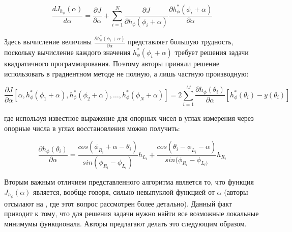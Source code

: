 \documentclass[a4paper, 12pt, titlepage]{article}
\theoremstyle{definition}
\theoremstyle{plain}
\theoremstyle{plain}
\begin{document}
\begin{equation}
\frac{d J_{h_{\phi}}(\alpha)}{d \alpha} = \frac{\partial J}{\partial \alpha} +
\sum \limits_{i = 1}^{N} \frac{\partial J}{\partial h_{\phi}(\phi_{i} + \alpha)}
\frac{\partial h_{\phi}^{*}(\phi_{i} + \alpha) }{\partial \alpha}
\end{equation}

Здесь вычисление величины
$\frac{\partial h_{\phi}^{*}(\phi_{i} + \alpha)}{\partial \alpha}$ представляет
большую трудность, поскольку вычисление каждого значения
$h_{\phi}^{*}(\phi_{i} + \alpha)$ требует решения задачи квадратичного
программирования. Поэтому авторы приняли решение использовать в градиентном
методе не полную, а лишь частную производную:

\begin{equation}
\frac{\partial J}{\partial \alpha} [\alpha,
h_{\phi}^{*}(\phi_{1} + \alpha), h_{\phi}^{*}(\phi_{2} + \alpha), \ldots,
h_{\phi}^{*}(\phi_{N} + \alpha)] =
2 \sum \limits_{i = 1}^{M}  \frac{\partial h_{\phi}(\theta_{i}) }{\partial
\alpha} [h_{\phi}^{*}(\theta_{i}) - y(\theta_{i})]
\end{equation}

где используя известное выражение для опорных чисел в углах измерения через
опорные числа в углах восстановления можно получить:

\begin{equation}
\frac{\partial h_{\phi}(\theta_{i})}{\partial \alpha} =
\frac{cos(\phi_{R_{i}} + \alpha - \theta_{i})}{sin(\phi_{R_{i}} - \phi_{L_{i}})}
h_{L_{i}} +
\frac{cos(\theta_{i} - \phi_{L_{i}} - \alpha)}{sin(\phi_{R_{i}} - \phi_{L_{i})}}
h_{R_{i}}
\end{equation}

Вторым важным отличием представленного алгоритма является то, что функция
$J_{h_{\phi}}(\alpha)$ является, вообще говоря, сильно невыпуклой функцией от
$\alpha$ (авторы отсылают на \cite{thesis/Lele90}, где этот вопрос рассмотрен
более детально). Данный факт приводит к тому, что для решения задачи нужно
найти все возможные локальные минимумы функционала. Авторы предлагают делать это
следующим образом.
\end{document}
